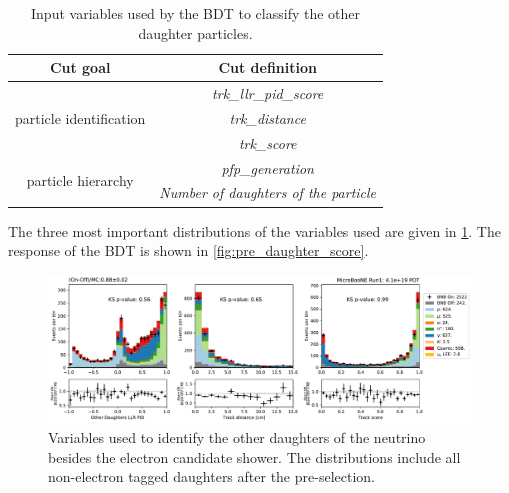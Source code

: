 \begin{table}[h!]
\centering
\setlength{\tabcolsep}{10pt}
\renewcommand{\arraystretch}{1.25}
\begin{tabular}{| c | c |} 
\hline
Cut goal & Cut definition \\
\hline\hline
\multirow{3}{*}{particle identification} & \textit{trk\_llr\_pid\_score} \\
                                         & \textit{trk\_distance} \\
                                         & \textit{trk\_score}\\
\hline
\multirow{2}{*}{particle hierarchy} & \textit{pfp\_generation} \\
                                    & \textit{Number of daughters of the particle} \\

 \hline
 \end{tabular}
 \caption{\label{tab:nuecc:other_bdt} Input variables used by the BDT to classify the other daughter particles.}
\end{table}

The three most important distributions of the variables used are given in \cref{fig:pre_daughter_1}. The response of the BDT is shown in \cref{fig:pre_daughter_score}.


\begin{figure}
    \centering
    \includegraphics[width=\textwidth]{NueCCsel/Images/run1/pre_daughter_1.pdf}
    \caption{Variables used to identify the other daughters of the neutrino besides the electron candidate shower. The distributions include all non-electron tagged daughters after the pre-selection.}
    \label{fig:pre_daughter_1}
\end{figure}


